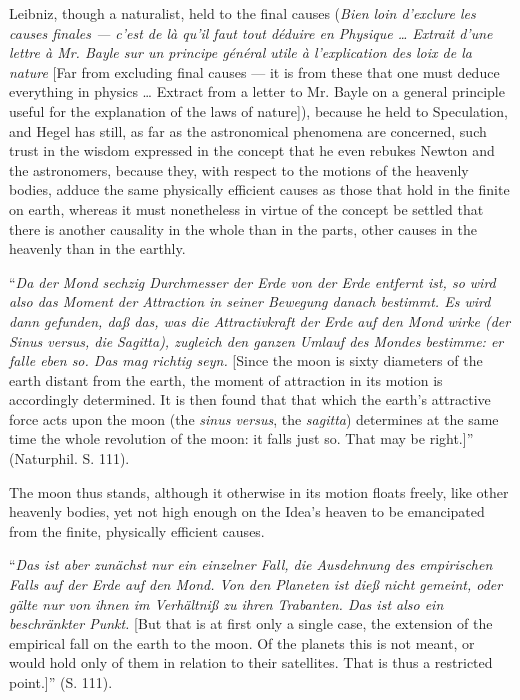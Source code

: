 \documentclass[12pt]{book}
\begin{document}
Leibniz, though a naturalist, held to the final causes (\textit{Bien loin d'exclure les causes finales ---
c'est de là qu'il faut tout déduire en Physique \ldots{} Extrait d'une lettre à Mr. Bayle sur un principe
général utile à l'explication des loix de la nature} [Far from excluding final causes --- it is from these
that one must deduce everything in physics \ldots{} Extract from a letter to Mr. Bayle on a general principle
useful for the explanation of the laws of nature]),
because he held to Speculation, and Hegel has still, as far as the astronomical phenomena are concerned,
such trust in the wisdom expressed in the concept that he even rebukes Newton and the astronomers,
because they, with respect to the motions of the heavenly bodies, adduce the same physically efficient
causes as those that hold in the finite on earth, whereas it must nonetheless in virtue
of the concept be settled that there is another causality in the whole than in the parts, other causes in
the heavenly than in the earthly.

``\textit{Da der Mond sechzig Durchmesser der Erde von der Erde entfernt ist, so wird also das Moment der
Attraction in seiner Bewegung danach bestimmt. Es wird dann gefunden, daß das, was die Attractivkraft der
Erde auf den Mond wirke (der} \textit{Sinus versus}\textit{, die} \textit{Sagitta}\textit{), zugleich den
ganzen Umlauf des Mondes bestimme: er falle eben so. Das mag richtig seyn.} [Since the moon is sixty
diameters of the earth distant from the earth, the moment of attraction in its motion is accordingly
determined. It is then found that that which the earth's attractive force acts upon the moon (the
\textit{sinus versus}, the \textit{sagitta}) determines at the same time the whole revolution of the moon:
it falls just so. That may be right.]'' (Naturphil. S. 111).

The moon thus stands, although it otherwise in its motion floats freely, like other heavenly bodies, yet
not high enough on the Idea's heaven to be emancipated from the finite, physically efficient causes.

``\textit{Das ist aber zunächst nur ein einzelner Fall, die Ausdehnung des empirischen Falls auf der Erde
auf den Mond. Von den Planeten ist dieß nicht gemeint, oder gälte nur von ihnen im Verhältniß zu ihren
Trabanten. Das ist also ein beschränkter Punkt.} [But that is at first only a single case, the extension of
the empirical fall on the earth to the moon. Of the planets this is not meant, or would hold only of them
in relation to their satellites. That is thus a restricted point.]'' (S. 111).
\end{document}
